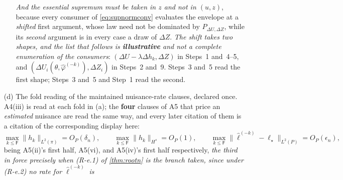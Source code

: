 \begin{definition}
\begin{enumerate}
\begin{enumerate}
\emph{And the essential supremum must be taken in $z$ and not
in $(u,z)$}, because every consumer of \eqref{eq:supnormconv} evaluates the envelope at a
\emph{shifted} first argument, whose law need not be dominated by $P_{\Delta U,\Delta Z}$, while its
\emph{second} argument is in every case a draw of $\Delta Z$. \emph{The shift takes two shapes, and the
list that follows is \textbf{illustrative} and not a complete enumeration of the consumers}:
$(\Delta U-\lambda\Delta h_k,\Delta Z)$ in  Steps~1 and~4--5, and
$(\Delta U_i(\theta,\hat\varphi^{(-k)}),\Delta Z_i)$ in  Steps~2 and~9.
 Steps~3 and~5 read the first shape;  Steps~3 and~5 and
 Step~1 read the second.
\end{enumerate}
\item[(d)] The fold reading of the maintained nuisance-rate clauses, declared once. A4(iii) is read
at each fold in (a); the \textbf{four} clauses of A5 that price an \emph{estimated} nuisance are read the
same way, and every later citation of them is a citation of the corresponding display here:
\begin{equation}\label{eq:foldrates}
\max_{k\le\mathsf F}\big\|h_k\big\|_{L^{2}(\pi)}=O_P(\delta_n),
\qquad
\max_{k\le\mathsf F}\big\|h_k\big\|_{H^{s}}=O_P(1),
\qquad
\max_{k\le\mathsf F}\big\|\hat\ell^{(-k)}-\ell_\star\big\|_{L^{2}(P)}=O_P(\epsilon_n),
\end{equation}
being A5(ii)'s first half, A5(vi), and A5(iv)'s first half respectively, \emph{the third in force precisely
when (R-e.1) of \cref{thm:rootn} is the branch taken, since under (R-e.2) no rate for $\hat\ell^{(-k)}$ is
}
\end{enumerate}
\end{definition}
